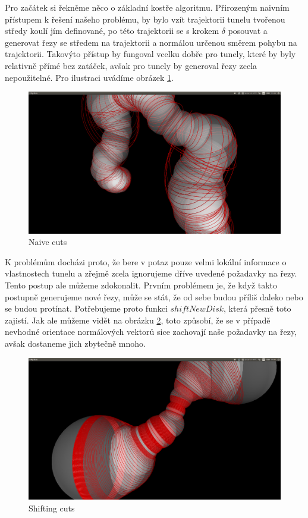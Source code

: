 Pro začátek si řekněme něco o základní kostře algoritmu. Přirozeným naivním přístupem
k řešení našeho problému, by bylo vzít trajektorii tunelu tvořenou středy koulí
jím definované, po této trajektorii se s krokem $ \delta $ posouvat a generovat
řezy se středem na trajektorii a normálou určenou směrem pohybu na trajektorii.
Takovýto přístup by fungoval vcelku dobře pro tunely, které by byly relativně
přímé bez zatáček, avšak pro  tunely by generoval řezy zcela nepoužitelné.
Pro ilustraci uvádíme obrázek \ref{fig:naive_cuts}.

\begin{figure}[ht]
    \centering
    \includegraphics[width=\textwidth]{img/naive_cuts.png}
    \caption{Naive cuts}
  \centering
  \label{fig:naive_cuts}
\end{figure}

K problémům docházi proto, že bere v potaz pouze velmi lokální informace o vlastnostech
tunelu a zřejmě zcela ignorujeme dříve uvedené požadavky na řezy. Tento postup ale
můžeme zdokonalit. Prvním problémem je, že když takto postupně generujeme nové řezy,
může se stát, že od sebe budou příliš daleko nebo se budou protínat. Potřebujeme proto
funkci $ shiftNewDisk $, která přesně toto zajistí. Jak ale můžeme vidět na obrázku
\ref{fig:shift_cuts}, toto způsobí, že se v případě nevhodné orientace normálových
vektorů sice zachovají naše požadavky na řezy, avšak dostaneme jich zbytečně mnoho.

\begin{figure}[ht]
    \centering
    \includegraphics[width=\textwidth]{img/shift_cuts.png}
    \caption{Shifting cuts}
  \centering
  \label{fig:shift_cuts}
\end{figure}

